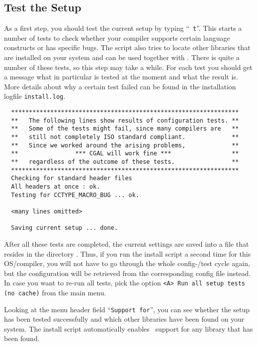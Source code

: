\subsection{Test the Setup\label{sec:test-the-setup}}

As a first step, you should test the current setup by typing ``{\tt
  t}''. This starts a number of tests to check whether your compiler
supports certain language constructs or has specific bugs.  The script
also tries to locate other libraries that are installed on your system
and can be used together with \cgal. There is quite a number of these
tests, so this step may take a while.  For each test you should get a
message what in particular is tested at the moment and what the result
is. More details about why a certain test failed can be found in the
installation logfile \texttt{install.log}.

{\ccTexHtml{\scriptsize}{}
\begin{verbatim}
  ****************************************************************
  **   The following lines show results of configuration tests. **
  **   Some of the tests might fail, since many compilers are   **
  **   still not completely ISO standard compliant.             **
  **   Since we worked around the arising problems,             **
  **                *** CGAL will work fine ***                 **
  **   regardless of the outcome of these tests.                **
  ****************************************************************
  Checking for standard header files
  All headers at once : ok.
  Testing for CCTYPE_MACRO_BUG ... ok.

  <many lines omitted>

  Saving current setup ... done.
\end{verbatim}
}

After all these tests are completed, the current settings are saved
into a file that resides in the directory \cgalinstconfdir.  Thus, if
you run the install script a second time for this OS/compiler, you
will not have to go through the whole config-/test cycle again, but
the configuration will be retrieved from the corresponding config file
instead. In case you want to re-run all tests, pick the option
\texttt{<A> Run all setup tests (no cache)} from the main menu.

Looking at the menu header field ``\texttt{Support for}'', you can see
whether the setup has been tested successfully and which other
libraries have been found on your system. The install script
automatically enables \cgal\ support for any library that has been
found.

